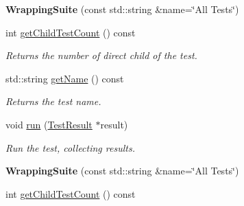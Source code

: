 \begin{DoxyCompactItemize}
\item 
\hypertarget{class_test_runner_1_1_wrapping_suite_ab88439688c6c516282a4ad48568561a2}{{\bfseries Wrapping\+Suite} (const std\+::string \&name=\char`\"{}All Tests\char`\"{})}\label{class_test_runner_1_1_wrapping_suite_ab88439688c6c516282a4ad48568561a2}

\item 
\hypertarget{class_test_runner_1_1_wrapping_suite_a5ef6d3d00fbc6493c06a2dc1f0e93077}{int \hyperlink{class_test_runner_1_1_wrapping_suite_a5ef6d3d00fbc6493c06a2dc1f0e93077}{get\+Child\+Test\+Count} () const }\label{class_test_runner_1_1_wrapping_suite_a5ef6d3d00fbc6493c06a2dc1f0e93077}

\begin{DoxyCompactList}\small\item\em Returns the number of direct child of the test. \end{DoxyCompactList}\item 
std\+::string \hyperlink{class_test_runner_1_1_wrapping_suite_a500c7e2413a4830b87d8ab061251f856}{get\+Name} () const 
\begin{DoxyCompactList}\small\item\em Returns the test name. \end{DoxyCompactList}\item 
\hypertarget{class_test_runner_1_1_wrapping_suite_aa486bfea64b60206ac1d8fbb006f2f64}{void \hyperlink{class_test_runner_1_1_wrapping_suite_aa486bfea64b60206ac1d8fbb006f2f64}{run} (\hyperlink{class_test_result}{Test\+Result} $\ast$result)}\label{class_test_runner_1_1_wrapping_suite_aa486bfea64b60206ac1d8fbb006f2f64}

\begin{DoxyCompactList}\small\item\em Run the test, collecting results. \end{DoxyCompactList}\item 
\hypertarget{class_test_runner_1_1_wrapping_suite_a3edce0cce0e3fdc996994d3dfe8f35fb}{{\bfseries Wrapping\+Suite} (const std\+::string \&name=\char`\"{}All Tests\char`\"{})}\label{class_test_runner_1_1_wrapping_suite_a3edce0cce0e3fdc996994d3dfe8f35fb}

\item 
\hypertarget{class_test_runner_1_1_wrapping_suite_a5ef6d3d00fbc6493c06a2dc1f0e93077}{int \hyperlink{class_test_runner_1_1_wrapping_suite_a5ef6d3d00fbc6493c06a2dc1f0e93077}{get\+Child\+Test\+Count} () const }\label{class_test_runner_1_1_wrapping_suite_a5ef6d3d00fbc6493c06a2dc1f0e93077}


\end{DoxyCompactItemize}
